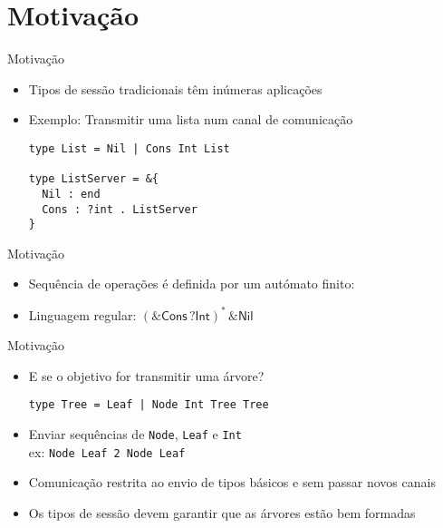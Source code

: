 \section{Motivação}

\begin{frame}[fragile]{Motivação}

  \begin{itemize}
    \item Tipos de sessão tradicionais têm inúmeras aplicações
    \newline
  \item Exemplo: Transmitir uma lista num canal de comunicação
    \newline
    
\begin{lstlisting}    
type List = Nil | Cons Int List

type ListServer = &{
  Nil : end
  Cons : ?int . ListServer
}
\end{lstlisting}
  \end{itemize}
\end{frame}


\begin{frame}{Motivação}
  \begin{itemize}
    \item Sequência de operações é definida por um autómato finito:
      \newline
      
    \item Linguagem regular: $(\textsf{\&Cons}\,\textsf{?Int})^{*}\,\textsf{\&Nil}$
      
  \end{itemize}

\end{frame}

\begin{frame}[fragile]{Motivação}
  \begin{itemize}
  \item E se o objetivo for transmitir uma árvore?
    \newline
    
    \lstinline"type Tree = Leaf | Node Int Tree Tree"
    \newline
  \item Enviar sequências de \lstinline|Node|, \lstinline|Leaf| e \lstinline|Int|\\
    ex: \lstinline|Node Leaf 2 Node Leaf|
  \newline
  \item Comunicação restrita ao envio de tipos básicos e sem passar novos canais
  \newline
  \item Os tipos de sessão devem garantir que as árvores estão bem formadas
  \end{itemize}
\end{frame}

